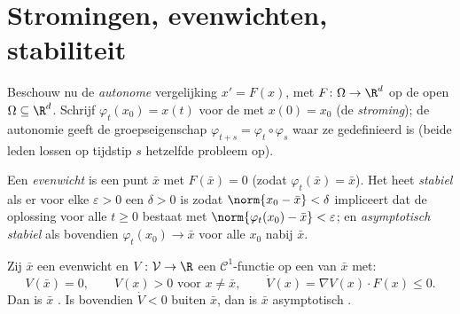 \section{Stromingen, evenwichten, stabiliteit}

Beschouw nu de \emph{autonome} vergelijking $x' = F(x)$, met $F
\colon \Omega \to \R^d$  op de open $\Omega
\subseteq \R^d$. Schrijf $\varphi_t(x_0) = x(t)$ voor de  met $x(0) = x_0$ (de \emph{stroming}); de autonomie geeft de groepseigenschap
$\varphi_{t+s} = \varphi_t\circ\varphi_s$ waar ze gedefinieerd is
(beide leden lossen op tijdstip $s$ hetzelfde probleem op).

\begin{definition}\label{def:b3:ode:stability}
Een \emph{evenwicht} is een punt $\bar x$ met $F(\bar x) = 0$
(zodat $\varphi_t(\bar x) = \bar x$). Het heet
\emph{stabiel} als er voor elke
$\varepsilon > 0$ een $\delta > 0$ is zodat $\norm{x_0 - \bar x}
< \delta$ impliceert dat de oplossing voor alle $t \geq 0$
bestaat met $\norm{\varphi_t(x_0) - \bar x} < \varepsilon$; en
\emph{asymptotisch stabiel} als bovendien $\varphi_t(x_0) \to
\bar x$ voor alle $x_0$ nabij $\bar x$.
\end{definition}

\begin{theorem}[Lyapunovfuncties]\label{thm:b3:ode:lyapunov}
Zij $\bar x$ een evenwicht en $V \colon \mathcal V \to \R$ een
$\mathcal C^1$-functie op een  van $\bar x$
met:
\[
V(\bar x) = 0,\qquad V(x) > 0 \text{ voor } x \neq \bar x,
\qquad \dot V(x) = \nabla V(x)\cdot F(x) \leq 0 .
\]
Dan is $\bar x$ . Is bovendien $\dot V < 0$ buiten $\bar
x$, dan is $\bar x$ asymptotisch .
\end{theorem}

